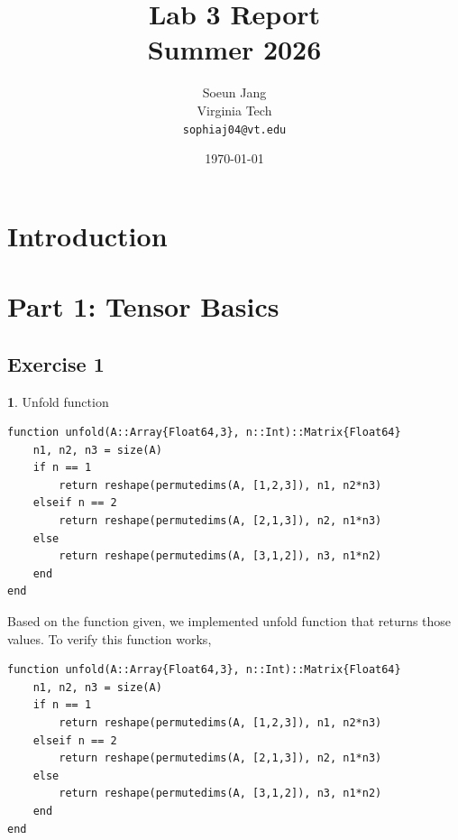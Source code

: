 \documentclass[11pt]{article}
\title{
    \vspace{-1cm}
    \textbf{Lab 3 Report}\\
    \vspace{0.2cm}
    Summer 2026
}
\author{
    Soeun Jang \\
    Virginia Tech \\
    \texttt{sophiaj04@vt.edu}
}
\date{\today}
\begin{document}
\maketitle
\newpage   

\tableofcontents
\newpage   

\section*{Introduction}



\section*{Part 1: Tensor Basics}

\subsection*{Exercise 1}
\textbf{1}. Unfold function

\begin{lstlisting}
function unfold(A::Array{Float64,3}, n::Int)::Matrix{Float64}
    n1, n2, n3 = size(A)
    if n == 1
        return reshape(permutedims(A, [1,2,3]), n1, n2*n3)
    elseif n == 2
        return reshape(permutedims(A, [2,1,3]), n2, n1*n3)
    else
        return reshape(permutedims(A, [3,1,2]), n3, n1*n2)
    end
end

\end{lstlisting}

Based on the function given, we implemented unfold function that returns those values. To verify this function works, 

\begin{lstlisting}
function unfold(A::Array{Float64,3}, n::Int)::Matrix{Float64}
    n1, n2, n3 = size(A)
    if n == 1
        return reshape(permutedims(A, [1,2,3]), n1, n2*n3)
    elseif n == 2
        return reshape(permutedims(A, [2,1,3]), n2, n1*n3)
    else
        return reshape(permutedims(A, [3,1,2]), n3, n1*n2)
    end
end

\end{lstlisting}
\end{document}

